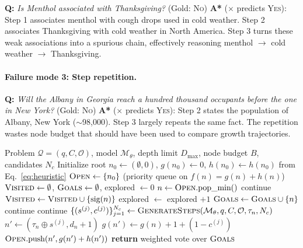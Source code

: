 \documentclass[11pt]{article}
\begin{document}
\begin{examplebox}[title=StrategyQA --- Spurious Correlation]
\textbf{Q:} \emph{Is Menthol associated with Thanksgiving?} \quad (Gold: \textsc{No})
\tcblower
\textbf{A*} ($\times$ predicts \textsc{Yes}): Step 1 associates menthol with cough drops used in cold weather. Step 2 associates Thanksgiving with cold weather in North America. Step 3 turns these weak associations into a spurious chain, effectively reasoning menthol $\rightarrow$ cold weather $\rightarrow$ Thanksgiving.
\end{examplebox}

\paragraph{Failure mode 3: Step repetition.}

\begin{examplebox}[title=StrategyQA --- Step Repetition]
\textbf{Q:} \emph{Will the Albany in Georgia reach a hundred thousand occupants before the one in New York?} \quad (Gold: \textsc{No})
\tcblower
\textbf{A*} ($\times$ predicts \textsc{Yes}): Step 2 states the population of Albany, New York ($\sim$98{,}000). Step 3 largely repeats the same fact. The repetition wastes node budget that should have been used to compare growth trajectories.
\end{examplebox}


\begin{algorithm}[t]
\caption{Budgeted A* Search over Reasoning Traces}
\label{alg:astar}
\begin{algorithmic}[1]
\REQUIRE Problem $\mathcal{Q}=(q,C,\mathcal{O})$, model $\mathcal{M}_\theta$, depth limit $D_{\max}$, node budget $B$, candidates $N_c$
\STATE Initialize root $n_0 \gets (\emptyset,0)$, $g(n_0) \gets 0$, $h(n_0) \gets h(n_0)$ from Eq.~\eqref{eq:heuristic}
\STATE $\textsc{Open} \gets \{n_0\}$ (priority queue on $f(n)=g(n)+h(n)$)
\STATE $\textsc{Visited} \gets \emptyset$, $\textsc{Goals} \gets \emptyset$, explored $\gets 0$
    \STATE $n \gets \textsc{Open}.\text{pop\_min}()$
        \STATE continue
    \ENDIF
    \STATE $\textsc{Visited} \gets \textsc{Visited} \cup \{\text{sig}(n)\}$
    \STATE explored $\gets$ explored $+ 1$
        \STATE $\textsc{Goals} \gets \textsc{Goals} \cup \{n\}$
        \STATE continue
    \ENDIF
        \STATE continue
    \ENDIF
    \STATE $\{(s^{(j)}, c^{(j)})\}_{j=1}^{N_c} \gets \textsc{GenerateSteps}(\mathcal{M}_\theta, q, C, \mathcal{O}, \tau_n, N_c)$
        \STATE $n' \gets (\tau_n \oplus s^{(j)}, d_n+1)$
        \STATE $g(n') \gets g(n) + 1 + (1-c^{(j)})$
        \STATE $\textsc{Open}.\text{push}(n', g(n') + h(n'))$
    \ENDFOR
\ENDWHILE
\STATE \textbf{return} weighted vote over $\textsc{Goals}$
\end{algorithmic}
\end{algorithm}
\end{document}
